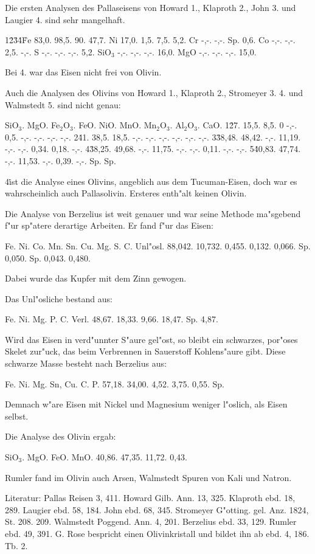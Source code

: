 \documentclass[a4paper, 11pt, oneside]{article}
\begin{document}
Die ersten Analysen des Pallaseisens von Howard 1., Klaproth 2., John 3. und Laugier 4. sind sehr mangelhaft.

1\. 2\. 3\. 4\.  
Fe 83,0. 98,5. 90. 47,7.  
Ni 17,0. 1,5. 7,5. 5,2.  
Cr -,-. -,-. Sp. 0,6.  
Co -,-. -,-. 2,5. -,-.  
S -,-. -,-. -,-. 5,2.  
SiO$_{3}$ -,-. -,-. -,-. 16,0.  
MgO -,-. -,-. -,-. 15,0.

Bei 4. war das Eisen nicht frei von Olivin.

Auch die Analysen des Olivins von Howard 1., Klaproth 2., Stromeyer 3. 4. und Walmstedt 5. sind nicht genau:

SiO$_{3}$. MgO. Fe$_{2}$O$_{3}$. FeO. NiO. MnO. Mn$_{2}$O$_{3}$. Al$_{2}$O$_{3}$. CaO.  
1\. 27. 15,5. 8,5. 0 -,-. 0,5. -,-. -,-. -,-. -,-.  
2\. 41. 38,5. 18,5. -,-. -,-. -,-. -,-. -,-. -,-.  
3\. 38,48. 48,42. -,-. 11,19. -,-. -,-. 0,34. 0,18. -,-.  
4\. 38,25. 49,68. -,-. 11,75. -,-. -,-. 0,11. -,-. -,-.  
5\. 40,83. 47,74. -,-. 11,53. -,-. 0,39. -,-. Sp. Sp.  

4\. ist die Analyse eines Olivins, angeblich aus dem Tucuman-Eisen, doch war es wahrscheinlich auch Pallasolivin. Ersteres enth"alt keinen Olivin.

Die Analyse von Berzelius ist weit genauer und war seine Methode ma"sgebend f"ur sp"atere derartige Arbeiten. Er fand f"ur das Eisen:

Fe. Ni. Co. Mn. Sn. Cu. Mg. S. C. Unl"osl.  
88,042. 10,732. 0,455. 0,132. 0,066. Sp. 0,050. Sp. 0,043. 0,480.

Dabei wurde das Kupfer mit dem Zinn gewogen.

Das Unl"osliche bestand aus:

Fe. Ni. Mg. P. C. Verl.  
48,67. 18,33. 9,66. 18,47. Sp. 4,87.

Wird das Eisen in verd"unnter S"aure gel"ost, so bleibt ein schwarzes, por"oses Skelet zur"uck, das beim Verbrennen in Sauerstoff Kohlens"aure gibt. Diese schwarze Masse besteht nach Berzelius aus:

Fe. Ni. Mg. Sn, Cu. C. P.
57,18. 34,00. 4,52. 3,75. 0,55. Sp.

Demnach w"are Eisen mit Nickel und Magnesium weniger l"oslich, als Eisen selbst.

Die Analyse des Olivin ergab:

SiO$_{3}$. MgO. FeO. MnO.  
40,86. 47,35. 11,72. 0,43.

Rumler fand im Olivin auch Arsen, Walmstedt Spuren von Kali und Natron.

Literatur: Pallas Reisen 3, 411. Howard Gilb. Ann. 13, 325. Klaproth ebd. 18, 289. Laugier ebd. 58, 184. John ebd. 68, 345. Stromeyer G"otting. gel. Anz. 1824, St. 208. 209. Walmstedt Poggend. Ann. 4, 201. Berzelius ebd. 33, 129. Rumler ebd. 49, 391. G. Rose bespricht einen Olivinkristall und bildet ihn ab ebd. 4, 186. Tb. 2.
\end{document}
